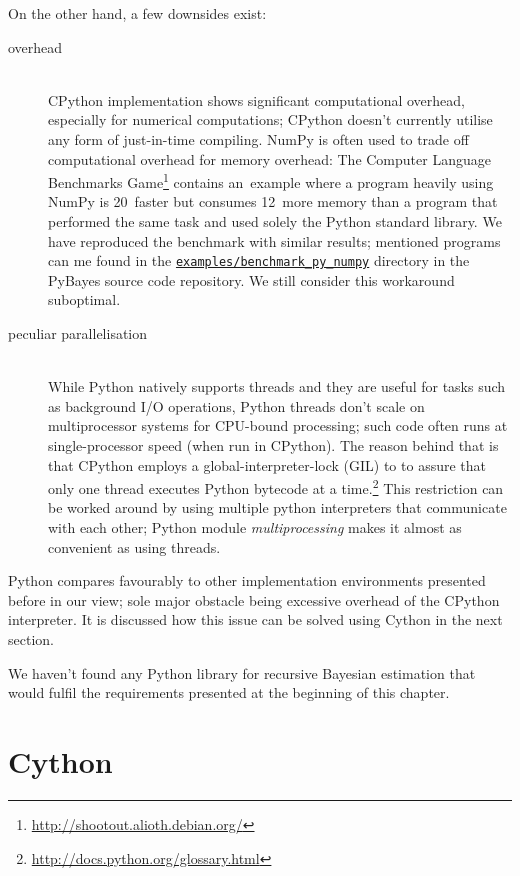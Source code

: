 On the other hand, a few downsides exist:
\begin{description}
	\item[overhead] \hfill \\
		CPython implementation shows significant computational overhead, especially for numerical
		computations; CPython doesn't currently utilise any form of just-in-time compiling.
		NumPy is often used to trade off computational overhead for memory overhead:
		The Computer Language Benchmarks Game\footnote{\url{http://shootout.alioth.debian.org/}}
		contains an~example where a program heavily using NumPy is 20\x\ faster but consumes
		12\x\ more memory than a program that performed the same task and used solely the
		Python standard library. We have reproduced the benchmark with similar results; mentioned
		programs can me found in the
		\href{http://github.com/strohel/PyBayes/tree/master/examples/benchmark_py_numpy}{\nolinkurl{examples/benchmark_py_numpy}}
		directory in the PyBayes source code repository. We still consider this workaround suboptimal.
	\item[peculiar parallelisation] \hfill \\
		While Python natively supports threads and they are useful for tasks such as background I/O
		operations, Python threads don't scale on multiprocessor systems for CPU-bound processing;
		such code often runs at single-processor speed (when run in CPython). The reason behind that
		is that CPython employs a global-interpreter-lock (GIL) to to assure that only one thread
		executes Python bytecode at a time.\footnote{\url{http://docs.python.org/glossary.html}} This
		restriction can be worked around by using multiple python interpreters that communicate with
		each other; Python module \emph{multiprocessing} makes it almost as convenient as using
		threads.
\end{description}
Python compares favourably to other implementation environments presented before in our view; sole
major obstacle being excessive overhead of the CPython interpreter. It is discussed how this issue
can be solved using Cython in the next section.

We haven't found any Python library for recursive Bayesian estimation that would fulfil the
requirements presented at the beginning of this chapter.

\section{Cython}

